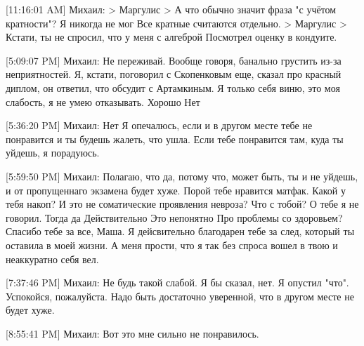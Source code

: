 \documentclass{article}
\begin{document}
[11:16:01 AM] Михаил:
> Маргулис
> А что обычно значит фраза "с учётом кратности"? Я никогда не мог
Все кратные считаются отдельно.
> Маргулис
> Кстати, ты не спросил, что у меня с алгеброй
Посмотрел оценку в кондуите.

[5:09:07 PM] Михаил:
Не переживай.
 Вообще говоря, банально грустить из-за неприятностей.
 Я, кстати, поговорил с Скопенковым еще, сказал про красный диплом, он ответил, что обсудит с Артамкиным.
 Я только себя виню, это моя слабость, я не умею отказывать.
 Хорошо
 Нет

[5:36:20 PM] Михаил:
Нет
 Я опечалюсь, если и в другом месте тебе не понравится и ты будешь жалеть, что ушла. Если тебе понравится там, куда ты уйдешь, я порадуюсь.

[5:59:50 PM] Михаил:
Полагаю, что да, потому что, может быть, ты и не уйдешь, и от пропущеннаго экзамена будет хуже.
 Порой тебе нравится матфак.
 Какой у тебя накоп?
 И это не соматические проявления невроза?
 Что с тобой?
 О тебе я не говорил.
 Тогда да
 Действительно
 Это непонятно
 Про проблемы со здоровьем?
 Спасибо тебе за все, Маша.
 Я дейсвительно благодарен тебе за след, который ты оставила в моей жизни.
 А меня прости, что я так без спроса вошел в твою и неаккуратно себя вел.

[7:37:46 PM] Михаил:
Не будь такой слабой.
 Я бы сказал, нет.
 Я опустил "что".
 Успокойся, пожалуйста.
 Надо быть достаточно уверенной, что в другом месте не будет хуже.

[8:55:41 PM] Михаил:
Вот это мне сильно не понравилось. 
\end{document}
